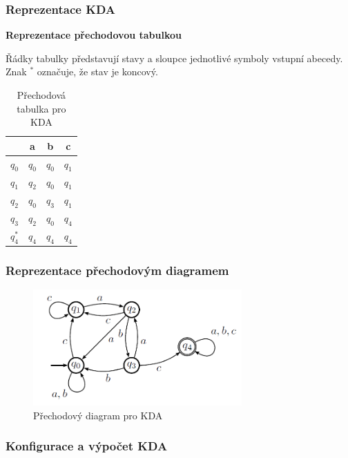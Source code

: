 \documentclass[10pt,a4paper]{article}
\theoremstyle{note}
\begin{document}
\subsubsection{Reprezentace KDA}
\textbf{Reprezentace přechodovou tabulkou}\\

\vspace{3mm}

Řádky tabulky představují stavy a sloupce jednotlivé symboly vstupní abecedy. Znak $^*$ označuje, že stav je koncový.
\begin{table}[h]
\begin{center}
\begin{tabular}{r || c | c | c}
 & a & b & c \\
\hline
 $q_0$ & $q_0$ & $q_0$ & $q_1$ \\
 $q_1$ & $q_2$ & $q_0$ & $q_1$ \\
 $q_2$ & $q_0$ & $q_3$ & $q_1$ \\
 $q_3$ & $q_2$ & $q_0$ & $q_4$ \\
 $q_4^*$ & $q_4$ & $q_4$ & $q_4$ \\
\end{tabular}
\end{center}
\caption{Přechodová tabulka pro KDA}
\end{table}


\subsubsection{Reprezentace přechodovým diagramem}

\vspace{3mm}

\begin{figure}[ht]
\begin{center}
\includegraphics[width=8cm]{img/KDA-priklad2.png}
\end{center}
\caption{Přechodový diagram pro KDA}
\end{figure}

\subsubsection{Konfigurace a výpočet KDA}
\end{document}
